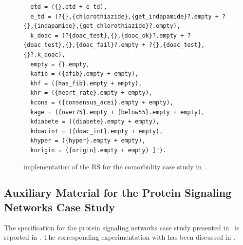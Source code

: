 \begin{figure}[t]
\begin{verbatim}
  etd = ({}.etd + e_td),
  e_td = (?{},{chlorothiazide},{get_indapamide}?.empty + ?{},{indapamide},{get_chlorothiazide}?.empty),
  k_doac = (?{doac_test},{},{doac_ok}?.empty + ?{doac_test},{},{doac_fail}?.empty + ?{},{doac_test},{}?.k_doac),
  empty = {}.empty,
  kafib = ({afib}.empty + empty),
  khf = ({has_fib}.empty + empty),
  khr = ({heart_rate}.empty + empty),
  kcons = ({consensus_acei}.empty + empty),
  kage = ({over75}.empty + {below55}.empty + empty),
  kdiabete = ({diabete}.empty + empty),
  kdoacint = ({doac_int}.empty + empty),
  khyper = ({hyper}.empty + empty),
  korigin = ({origin}.empty + empty) ]").
\end{verbatim}
\normalsize
\caption{\BioResolve implementation of the RS for the comorbidity case study in~.}
\label{fig:bioresolve:comorbidities}
\end{figure}

\subsection{Auxiliary Material for the Protein Signaling Networks Case Study}\label{app:psn}

The \BioResolve specification for the protein signaling networks case study presented in~\cite{DBLP:conf/cmsb/BallisBFO24} is reported in . The corresponding experimentation with \GROOVE has been discussed in .


